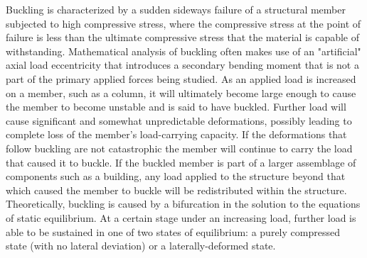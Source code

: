 	Buckling is characterized by a sudden sideways failure of a structural member subjected to high compressive stress, where the compressive stress at the point of failure is less than the ultimate compressive stress that the material is capable of withstanding. Mathematical analysis of buckling often makes use of an "artificial" axial load eccentricity that introduces a secondary bending moment that is not a part of the primary applied forces being studied. As an applied load is increased on a member, such as a column, it will ultimately become large enough to cause the member to become unstable and is said to have buckled. Further load will cause significant and somewhat unpredictable deformations, possibly leading to complete loss of the member's load-carrying capacity. If the deformations that follow buckling are not catastrophic the member will continue to carry the load that caused it to buckle. If the buckled member is part of a larger assemblage of components such as a building, any load applied to the structure beyond that which caused the member to buckle will be redistributed within the structure.
Theoretically, buckling is caused by a bifurcation in the solution to the equations of static equilibrium. At a certain stage under an increasing load, further load is able to be sustained in one of two states of equilibrium: a purely compressed state (with no lateral deviation) or a laterally-deformed state.

